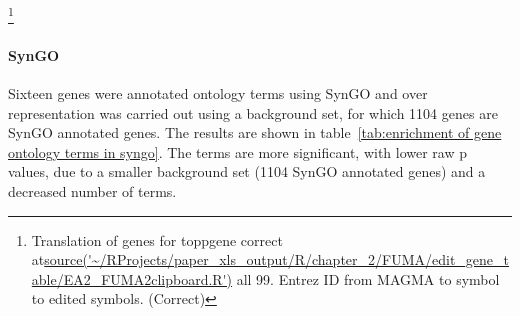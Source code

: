 

 
 \footnote{Translation of genes for toppgene correct at\url{source('~/RProjects/paper_xls_output/R/chapter_2/FUMA/edit_gene_table/EA2_FUMA2clipboard.R')} all 99.
  Entrez ID from MAGMA to symbol to edited symbols. (Correct)}
 
  
\paragraph{SynGO}

Sixteen genes were annotated ontology terms using SynGO and over representation was carried out using a background set, for which 1104 genes are SynGO annotated genes. The results are shown in table~\ref{tab:enrichment of gene ontology terms in syngo}. The terms are more significant, with lower raw p values, due to a smaller background set (1104 SynGO annotated genes) and a decreased number of terms. 

